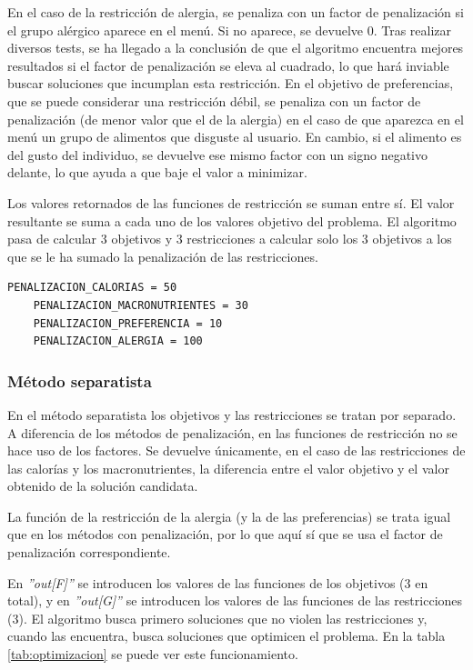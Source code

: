 En el caso de la restricción de alergia, se penaliza con un factor de penalización si el grupo alérgico aparece en el menú. Si no aparece, se devuelve 0. Tras realizar diversos tests, se ha llegado a la conclusión de que el algoritmo encuentra mejores resultados si el factor de penalización se eleva al cuadrado, lo que hará inviable buscar soluciones que incumplan esta restricción.
\newpage
En el objetivo de preferencias, que se puede considerar una restricción débil, se penaliza con un factor de penalización (de menor valor que el de la alergia) en el caso de que aparezca en el menú un grupo de alimentos que disguste al usuario. En cambio, si el alimento es del gusto del individuo, se devuelve ese mismo factor con un signo negativo delante, lo que ayuda a que baje el valor a minimizar.

Los valores retornados de las funciones de restricción se suman entre sí. El valor resultante se suma a cada uno de los valores objetivo del problema. El algoritmo pasa de calcular 3 objetivos y 3 restricciones a calcular solo los 3 objetivos a los que se le ha sumado la penalización de las restricciones.

\begin{lstlisting}[basicstyle=\ttfamily, caption=Factores de penalización.,label={lst:factores}]
    PENALIZACION_CALORIAS = 50
    PENALIZACION_MACRONUTRIENTES = 30
    PENALIZACION_PREFERENCIA = 10
    PENALIZACION_ALERGIA = 100
\end{lstlisting}

\subsubsection{Método separatista}
\label{ch:metodo-separatista}

En el método separatista los objetivos y las restricciones se tratan por separado. A diferencia de los métodos de penalización, en las funciones de restricción no se hace uso de los factores. Se devuelve únicamente, en el caso de las restricciones de las calorías y los macronutrientes, la diferencia entre el valor objetivo y el valor obtenido de la solución candidata.

La función de la restricción de la alergia (y la de las preferencias) se trata igual que en los métodos con penalización, por lo que aquí sí que se usa el factor de penalización correspondiente.

En \textit{''out[F]''} se introducen los valores de las funciones de los objetivos (3 en total), y en \textit{''out[G]''} se introducen los valores de las funciones de las restricciones (3). El algoritmo busca primero soluciones que no violen las restricciones y, cuando las encuentra, busca soluciones que optimicen el problema. En la tabla \ref{tab:optimizacion} se puede ver este funcionamiento.

